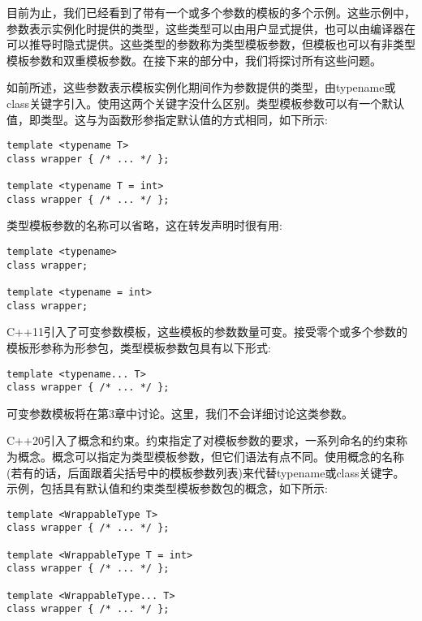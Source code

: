 
目前为止，我们已经看到了带有一个或多个参数的模板的多个示例。这些示例中，参数表示实例化时提供的类型，这些类型可以由用户显式提供，也可以由编译器在可以推导时隐式提供。这些类型的参数称为类型模板参数，但模板也可以有非类型模板参数和双重模板参数。在接下来的部分中，我们将探讨所有这些问题。


如前所述，这些参数表示模板实例化期间作为参数提供的类型，由typename或class关键字引入。使用这两个关键字没什么区别。类型模板参数可以有一个默认值，即类型。这与为函数形参指定默认值的方式相同，如下所示:

\begin{lstlisting}[style=styleCXX]
template <typename T>
class wrapper { /* ... */ };

template <typename T = int>
class wrapper { /* ... */ };
\end{lstlisting}

类型模板参数的名称可以省略，这在转发声明时很有用:

\begin{lstlisting}[style=styleCXX]
template <typename>
class wrapper;

template <typename = int>
class wrapper;
\end{lstlisting}

C++11引入了可变参数模板，这些模板的参数数量可变。接受零个或多个参数的模板形参称为形参包，类型模板参数包具有以下形式:

\begin{lstlisting}[style=styleCXX]
template <typename... T>
class wrapper { /* ... */ };
\end{lstlisting}

可变参数模板将在第3章中讨论。这里，我们不会详细讨论这类参数。

C++20引入了概念和约束。约束指定了对模板参数的要求，一系列命名的约束称为概念。概念可以指定为类型模板参数，但它们语法有点不同。使用概念的名称(若有的话，后面跟着尖括号中的模板参数列表)来代替typename或class关键字。示例，包括具有默认值和约束类型模板参数包的概念，如下所示:

\begin{lstlisting}[style=styleCXX]
template <WrappableType T>
class wrapper { /* ... */ };

template <WrappableType T = int>
class wrapper { /* ... */ };

template <WrappableType... T>
class wrapper { /* ... */ };
\end{lstlisting}

